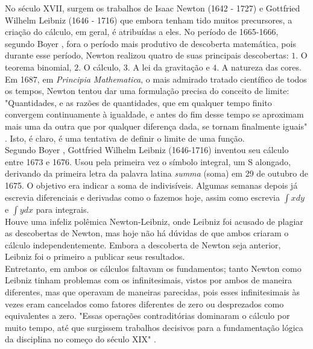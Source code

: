  No século XVII, surgem
os trabalhos de Isaac Newton (1642 - 1727) e Gottfried Wilhelm
Leibniz (1646 - 1716) que embora tenham tido muitos precursores, a
criação do cálculo, em geral, é atribuídas a eles. No período de
1665-1666,  segundo Boyer \cite{boyer}, fora o período mais produtivo de
descoberta matemática, pois durante esse período, Newton realizou
quatro de suas principais descobertas: $1.$ O teorema binomial, $2.$ O
cálculo, $3.$ A lei da gravitação e $4.$ A natureza das cores.\\


 Em 1687,
em \textit{Principia Mathematica}, o mais admirado tratado científico de
todos os tempos, Newton tentou dar uma formulação precisa do
conceito de limite: "Quantidades, e as razões de quantidades, que em
qualquer tempo finito convergem continuamente à igualdade, e antes
do fim desse tempo se aproximam mais uma da outra que por qualquer
diferença dada, se tornam finalmente iguais" \cite[p.274]{boyer}. Isto, é claro, é uma
tentativa de definir o limite de uma função.\\


 Segundo Boyer  \cite[p.277]{boyer},
Gottfried Wilhelm Leibniz (1646-1716) inventou seu cálculo entre
1673 e 1676. Usou pela primeira vez o símbolo integral, um S
alongado, derivando da primeira letra da palavra latina \textit{summa} (soma)
em 29 de outubro de 1675. O objetivo era indicar a soma de
indivisíveis. Algumas semanas depois já escrevia diferenciais e
derivadas como o fazemos hoje, assim como escrevia $\displaystyle \int x dy$ e $\displaystyle \int y dx$
para integrais.\\


 Houve uma infeliz polêmica Newton-Leibniz, onde
Leibniz foi acusado de plagiar as descobertas de Newton, mas hoje
não há dúvidas de que ambos criaram o cálculo independentemente.
Embora a descoberta de Newton seja anterior, Leibniz foi o primeiro
a publicar seus resultados.\\


Entretanto, em ambos os cálculos faltavam os fundamentos; tanto
Newton como Leibniz tinham problemas com os infinitesimais, vistos
por ambos de maneira diferentes, mas que operavam de maneiras
parecidas, pois esses infinitesimais às vezes eram cancelados como
fatores diferentes de zero ou desprezados como equivalentes a zero. "Essas operações contraditórias dominaram o cálculo por muito tempo,
até que surgissem trabalhos decisivos para a fundamentação lógica da
disciplina no começo do século XIX" \cite{avila}.\\


